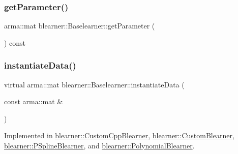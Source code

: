 \mbox{\label{classblearner_1_1_baselearner_a3362fe72e1b653ec3664cae2397414ed}} 
\subsubsection{\texorpdfstring{get\+Parameter()}{getParameter()}}
{\footnotesize\ttfamily arma\+::mat blearner\+::\+Baselearner\+::get\+Parameter (\begin{DoxyParamCaption}{ }\end{DoxyParamCaption}) const}

\mbox{\label{classblearner_1_1_baselearner_af01f1b8c4540927705ff79c3649489f7}} 
\subsubsection{\texorpdfstring{instantiate\+Data()}{instantiateData()}}
{\footnotesize\ttfamily virtual arma\+::mat blearner\+::\+Baselearner\+::instantiate\+Data (\begin{DoxyParamCaption}\item[{const arma\+::mat \&}]{ }\end{DoxyParamCaption})\hspace{0.3cm}{\ttfamily [pure virtual]}}



Implemented in \mbox{\hyperlink{classblearner_1_1_custom_cpp_blearner_a14607a1d1f312d46a3024b37085c146d}{blearner\+::\+Custom\+Cpp\+Blearner}}, \mbox{\hyperlink{classblearner_1_1_custom_blearner_a18971368219f6948456b8e60c20b6968}{blearner\+::\+Custom\+Blearner}}, \mbox{\hyperlink{classblearner_1_1_p_spline_blearner_ac0604daac451678e67a6a2ac60dd1b01}{blearner\+::\+P\+Spline\+Blearner}}, and \mbox{\hyperlink{classblearner_1_1_polynomial_blearner_a5d3a44e8a4a8155ac24ee05e2c68af75}{blearner\+::\+Polynomial\+Blearner}}.

\mbox{\label{classblearner_1_1_baselearner_ab37986047db43c84420fef2cef7fc20d}} 
